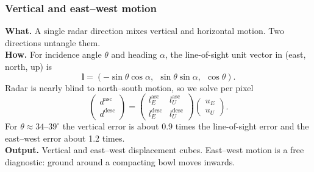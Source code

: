 \subsubsection{ Vertical and east--west motion}
\textbf{What.} A single radar direction mixes vertical and horizontal motion. Two directions untangle
them.\\
\textbf{How.} For incidence angle $\theta$ and heading $\alpha$, the line-of-sight unit vector in
(east, north, up) is
\[
\mathbf{l} = (-\sin\theta\cos\alpha,\ \ \sin\theta\sin\alpha,\ \ \cos\theta).
\]
Radar is nearly blind to north--south motion, so we solve per pixel \cite{wright2004}
\begin{equation}
\begin{pmatrix} d^{\mathrm{asc}}\\ d^{\mathrm{desc}}\end{pmatrix} =
\begin{pmatrix} l_E^{\mathrm{asc}} & l_U^{\mathrm{asc}}\\ l_E^{\mathrm{desc}} & l_U^{\mathrm{desc}}\end{pmatrix}
\begin{pmatrix}u_E\\u_U\end{pmatrix}.
\end{equation}
For $\theta \approx 34$--$39^\circ$ the vertical error is about 0.9 times the line-of-sight error and
the east--west error about 1.2 times.\\
\textbf{Output.} Vertical and east--west displacement cubes. East--west motion is a free diagnostic:
ground around a compacting bowl moves inwards.

